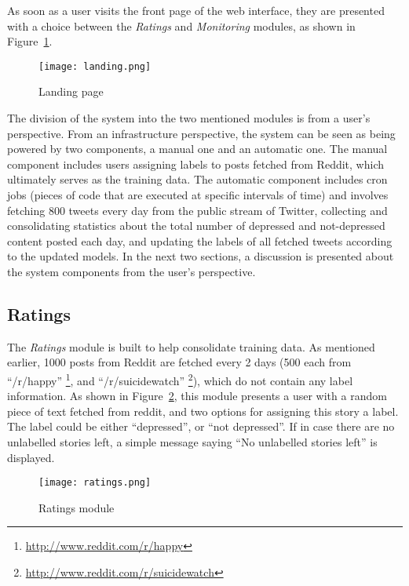 As soon as a user visits the front page of the web interface, they are presented with a choice between the \emph{Ratings} and \emph{Monitoring} modules, as shown in Figure~\ref{fig:landing}.\\

\begin{figure}
    \centering
    \texttt{[image: landing.png]}
    \caption{Landing page}
    \label{fig:landing}
\end{figure}

The division of the system into the two mentioned modules is from a user's perspective. From an infrastructure perspective, the system can be seen as being powered by two components, a manual one and an automatic one. The manual component includes users assigning labels to posts fetched from Reddit, which ultimately serves as the training data. The automatic component includes cron jobs (pieces of code that are executed at specific intervals of time) and involves fetching 800 tweets every day from the public stream of Twitter, collecting and consolidating statistics about the total number of depressed and not-depressed content posted each day, and updating the labels of all fetched tweets according to the updated models. In the next two sections, a discussion is presented about the system components from the user's perspective.

\subsection{Ratings}
The \emph{Ratings} module is built to help consolidate training data. As mentioned earlier, 1000 posts from Reddit are fetched every 2 days (500 each from ``/r/happy'' \footnote{\url{http://www.reddit.com/r/happy}}, and ``/r/suicidewatch'' \footnote{\url{http://www.reddit.com/r/suicidewatch}}), which do not contain any label information. As shown in Figure~\ref{fig:ratings}, this module presents a user with a random piece of text fetched from reddit, and two options for assigning this story a label. The label could be either ``depressed'', or ``not depressed''. If in case there are no unlabelled stories left, a simple message saying ``No unlabelled stories left'' is displayed.

\begin{figure}
    \centering
    \texttt{[image: ratings.png]}
    \caption{Ratings module}
    \label{fig:ratings}
\end{figure}

